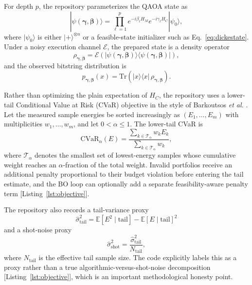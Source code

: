 \documentclass[11pt]{article}
\begin{document}
For depth \(p\), the repository parameterizes the QAOA state as
\begin{equation}
|\psi(\bm{\gamma},\bm{\beta})\rangle
= \prod_{\ell=1}^{p} e^{-i\beta_\ell H_M} e^{-i\gamma_\ell H_C} |\psi_0\rangle,
\label{eq:qaoastate}
\end{equation}
where \(|\psi_0\rangle\) is either \(|+\rangle^{\otimes n}\) or a feasible-state initializer such as Eq.~\eqref{eq:dickestate}. Under a noisy execution channel \(\mathcal{E}\), the prepared state is a density operator
\begin{equation}
\rho_{\bm{\gamma},\bm{\beta}} = \mathcal{E}\!\left(|\psi(\bm{\gamma},\bm{\beta})\rangle\langle\psi(\bm{\gamma},\bm{\beta})|\right),
\label{eq:density}
\end{equation}
and the observed bitstring distribution is
\begin{equation}
p_{\bm{\gamma},\bm{\beta}}(x)=\mathrm{Tr}\!\left(|x\rangle\langle x|\,\rho_{\bm{\gamma},\bm{\beta}}\right).
\label{eq:distribution}
\end{equation}

Rather than optimizing the plain expectation of \(H_C\), the repository uses a lower-tail Conditional Value at Risk (CVaR) objective in the style of Barkoutsos \emph{et al.} \cite{barkoutsos2020cvar}. Let the measured sample energies be sorted increasingly as \((E_1,\dots,E_m)\) with multiplicities \(w_1,\dots,w_m\), and let \(0<\alpha\le 1\). The lower-tail CVaR is
\begin{equation}
\mathrm{CVaR}_\alpha(E)
 = \frac{\sum_{k \in \mathcal{T}_\alpha} w_k E_k}{\sum_{k \in \mathcal{T}_\alpha} w_k},
\label{eq:cvar}
\end{equation}
where \(\mathcal{T}_\alpha\) denotes the smallest set of lowest-energy samples whose cumulative weight reaches an \(\alpha\)-fraction of the total weight. Invalid portfolios receive an additional penalty proportional to their budget violation before entering the tail estimate, and the BO loop can optionally add a separate feasibility-aware penalty term [Listing~\ref{lst:objective}].

The repository also records a tail-variance proxy
\begin{equation}
\widehat{\sigma}_{\mathrm{tail}}^2
 = \mathbb{E}[E^2 \mid \mathrm{tail}] - \mathbb{E}[E \mid \mathrm{tail}]^2
\label{eq:tailvariance}
\end{equation}
and a shot-noise proxy
\begin{equation}
\widehat{\sigma}_{\mathrm{shot}}^2
 = \frac{\widehat{\sigma}_{\mathrm{tail}}^2}{N_{\mathrm{tail}}},
\label{eq:shotproxy}
\end{equation}
where \(N_{\mathrm{tail}}\) is the effective tail sample size. The code explicitly labels this as a proxy rather than a true algorithmic-versus-shot-noise decomposition [Listing~\ref{lst:objective}], which is an important methodological honesty point.
\end{document}
